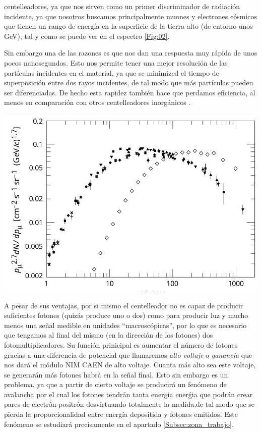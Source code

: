 \documentclass[11pt]{article}
\begin{document}
\begin{minipage}{0.49\linewidth}
	\begingroup
	\setlength{\parskip}{2.2mm} %
	centelleadores, ya que nos sirven como un primer discriminador de radiación incidente, ya que nosotros buscamos principalmente muones y electrones cósmicos que tienen un rango de energía en la superficie de la tierra alto (de entorno unos GeV), tal y como se puede ver en el espectro \ref{Fig:02}.

	Sin embargo una de las razones es que nos dan una respuesta muy rápida de unos pocos nanosegundos. Esto nos permite tener una mejor resolución de las partículas incidentes en el material, ya que se minimized el tiempo de superposición entre dos rayos incidentes, de tal modo que más partículas pueden ser diferenciadas. De hecho esta rapidez también hace que perdamos eficiencia, al menos en comparación con otros centelleadores inorgánicos \cite{ElthonHo}.
	\endgroup
\end{minipage}
\hfill
\begin{minipage}{0.49\linewidth}
	\begin{center}
		\includegraphics[width=0.95\linewidth]{../Imagenes/espectro.png}
		\label{Fig:02}
	\end{center}
\end{minipage}


A pesar de sus ventajas, por si mismo el centelleador no es capaz de producir suficientes fotones (quizás produce uno o dos) como para producir luz y mucho menos una señal medible en unidades ``macroscópicas'', por lo que es necesario que tengamos al final del mismo (en la dirección de los fotones) dos fotomultiplicadores. Su función prinicipal es aumentar el número de fotones gracias a una diferencia de potencial que llamaremos \textit{alto voltaje} o \textit{ganancia} que nos dará el módulo NIM CAEN de alto voltaje. Cuanta más alto sea este voltaje, se generarán más fotones habrá en la señal final. Esto sin embargo es un problema, ya que a partir de cierto voltaje se producirá un fenómeno de avalancha por el cual los fotones tendrán tanta energía enerǵia que podrán crear pares de electrón-positrón desvirtuando totalmente la medida,de tal modo que se pierda la proporcionalidad entre energía depositida y fotones emitidos. Este fenómeno se estudiará precisamente en el apartado \ref{Subsec:zona_trabajo}.
\end{document}
